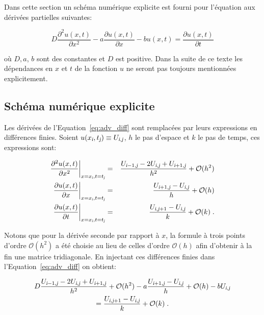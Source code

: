 \documentclass[a4paper, 12pt]{report}
\begin{document}
Dans cette section un schéma numérique explicite est fourni pour l'équation
aux dérivées partielles suivantes:

\begin{equation}
D \frac{\partial^2 u(x,t)}{\partial x^2} - a \frac{\partial u(x,t)}{\partial x} - b u(x,t) = \frac{\partial u(x,t)}{\partial t}
\label{eq:adv_diff}
\end{equation}

où $D, a$, $b$ sont des constantes et $D$ est positive. Dans la suite de ce texte les dépendances en $x$ et $t$
de la fonction $u$ ne seront pas toujours mentionnées explicitement.

\subsection*{Schéma numérique explicite}

Les dérivées de l'Equation~\ref{eq:adv_diff} sont remplacées par leurs expressions
en différences finies. Soient $u(x_{\textsl{i}}, t_{\textsl{j}}) \equiv U_{\textsl{i},\textsl{j}}$, $h$ le pas d'espace
et $k$ le pas de temps, ces expressions sont:

\begin{align}
  \frac{\partial^2 u (x,t)}{\partial x^2} \biggr |_{x=x_{\textsl{i}}, t=t_{\textsl{j}}} &=& \frac{U_{\textsl{i}-1,\textsl{j}} - 2 U_{\textsl{i},\textsl{j}} + U_{\textsl{i}+1,\textsl{j}}}{h^2} + \mathcal{O}(h^2)\\
  \frac{\partial u (x,t)}{\partial x} \biggr |_{x=x_{\textsl{i}}, t=t_{\textsl{j}}} &=& \frac{U_{\textsl{i}+1,\textsl{j}} - U_{\textsl{i},\textsl{j}}}{h} + \mathcal{O}(h)\\
  \frac{\partial u (x,t)}{\partial t} \biggr |_{x=x_{\textsl{i}}, t=t_{\textsl{j}}} &=& \frac{U_{\textsl{i},\textsl{j}+1} - U_{\textsl{i},\textsl{j}}}{k} + \mathcal{O}(k) \;.
\end{align}

Notons que pour la dérivée seconde par rapport à $x$, la formule à trois points d'ordre $\mathcal{O}(h^2)$ a été choisie
au lieu de celles d'ordre $\mathcal{O}(h)$ afin d'obtenir à la fin une matrice
tridiagonale. En injectant ces différences finies dans l'Equation~\ref{eq:adv_diff}
on obtient:

\begin{multline}
D \frac{U_{\textsl{i}-1,\textsl{j}} - 2 U_{\textsl{i},\textsl{j}} + U_{\textsl{i}+1,\textsl{j}}}{h^2} + \mathcal{O}(h^2) - a \frac{U_{\textsl{i}+1,\textsl{j}} - U_{\textsl{i},\textsl{j}}}{h} + \mathcal{O}(h) - b U_{\textsl{i},\textsl{j}}\\
= \frac{U_{\textsl{i},\textsl{j}+1} - U_{\textsl{i},\textsl{j}}}{k} + \mathcal{O}(k) \;.
\end{multline}
\end{document}
